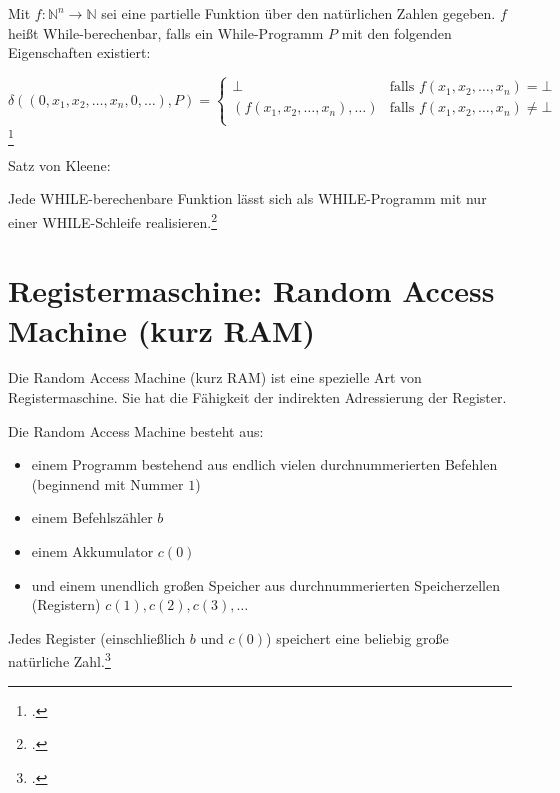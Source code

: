 \documentclass{lehramt-informatik-haupt}
\begin{document}
Mit $f : \mathbb{N}^n \rightarrow \mathbb{N}$ sei eine partielle
Funktion über den natürlichen Zahlen gegeben. $f$ heißt
While-berechenbar, falls ein While-Programm $P$ mit den folgenden
Eigenschaften existiert:

\begin{equation*}
\delta((0,x_1,x_2,\dots,x_n,0,\dots), P) =
\begin{cases}
\bot &
\text{falls } f(x_1,x_2,\dots,x_n) = \bot\\

(f(x_1,x_2,\dots,x_n), \dots) &
\text{falls }f(x_1,x_2,\dots,x_n) \neq \bot\\
\end{cases}
\end{equation*}\footcite[Seite 261]{hoffmann}

Satz von Kleene:

Jede WHILE-berechenbare Funktion lässt sich als WHILE-Programm mit nur
einer WHILE-Schleife realisieren.\footcite[Seite 13]{theo:fs:4}

%

\section{Registermaschine: Random Access Machine (kurz RAM)}

Die Random Access Machine (kurz RAM) ist eine spezielle Art von
Registermaschine. Sie hat die Fähigkeit der indirekten Adressierung der
Register.

Die Random Access Machine besteht aus:

\begin{itemize}
\item einem Programm bestehend aus endlich vielen durchnummerierten
Befehlen (beginnend mit Nummer $1$)

\item einem Befehlszähler $b$

\item einem Akkumulator $c(0)$

\item und einem unendlich großen Speicher aus durchnummerierten
Speicherzellen (Registern) $c(1), c(2), c(3), \dots$
\end{itemize}

Jedes Register (einschließlich $b$ und $c(0)$) speichert eine beliebig
große natürliche Zahl.\footcite{wiki:registermaschine}
\end{document}
